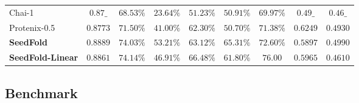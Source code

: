 \begin{table}[t]
\begin{tabular}{lcccccccc}
        Chai-1 & $0.87\_$ & $68.53\%$ & $23.64\%$ & $51.23\%$ & $50.91\%$ & $69.97\%$ & $0.49\_$ & $0.46\_$\\
        Protenix-0.5 & $0.8773$ & $71.50\%$ & $41.00\%$ & $62.30\%$ & $50.70\%$ & $71.38\%$ & $\mathbf{0.6249}$ & $0.4930$\\
        \midrule
        \textbf{SeedFold} & $\mathbf{0.8889}$ & $74.03\%$ & $\mathbf{53.21}\%$ & $63.12\%$ & $\mathbf{65.31}\%$ & $72.60\%$ & $0.5897$ & $0.4990$ \\
        \textbf{SeedFold-Linear} & $0.8861$ & $\mathbf{74.14\%}$ & $46.91\%$ & $\mathbf{66.48\%}$ & $61.80\%$ & $76.00$ & $0.5965$ & $0.4610$ \\
        \bottomrule
    \end{tabular}
\end{table}


\subsection{Benchmark}



